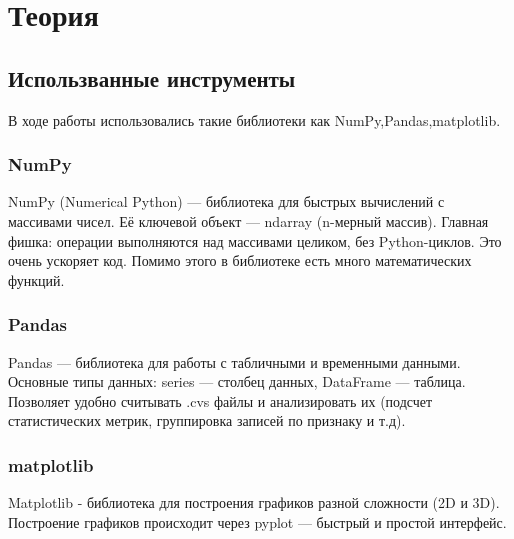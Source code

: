 \chapter{Теория}

\section{Использванные инструменты}
В ходе работы использовались такие библиотеки как NumPy,Pandas,matplotlib. \\

\subsection{NumPy}
NumPy (Numerical Python) — библиотека для быстрых вычислений с массивами чисел. Её ключевой объект — ndarray (n-мерный массив).
Главная фишка: операции выполняются над массивами целиком, без Python-циклов. Это очень ускоряет код. Помимо этого в библиотеке есть
много математических функций.

\subsection{Pandas}
Pandas — библиотека для работы с табличными и временными данными. Основные типы данных: series — столбец данных, DataFrame — таблица.
Позволяет удобно считывать .cvs файлы и анализировать их (подсчет статистических метрик, группировка записей по признаку и т.д).

\subsection{matplotlib}
Matplotlib - библиотека для построения графиков разной сложности (2D и 3D). Построение графиков происходит через pyplot — быстрый и простой интерфейс.

\endinput